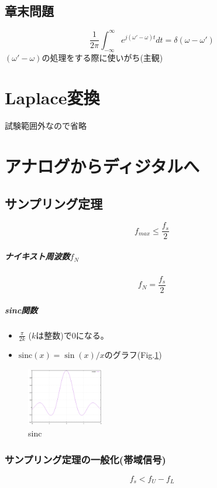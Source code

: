 \documentclass[twocolumn]{ltjsarticle}
\begin{document}
\subsection{章末問題}
$$\frac{1}{2\pi}\int_{-\infty}^{\infty}e^{j(\omega'-\omega)t}dt=\delta(\omega-\omega')$$
$(\omega'-\omega)$の処理をする際に使いがち(主観)
\section{Laplace変換}
試験範囲外なので省略
\section{アナログからディジタルへ}
\subsection{サンプリング定理}
$$f_{max}\leq\frac{f_s}{2}$$
\subparagraph{ナイキスト周波数$f_N$}
$$f_N=\frac{f_s}{2}$$
\subparagraph{sinc関数}
\begin{itemize}
    \item $\frac{\pi}{2k}$ ($k$は整数)で0になる。
    \item $\mathrm{sinc}(x)=\sin(x)/{x}$のグラフ(Fig.\ref{fig_sinc})
\end{itemize}
\begin{figure}[ht]
    \centering
    \includegraphics[width=0.3\textwidth]{./fig/fig_sinc.png}
    \caption{sinc}
    \label{fig_sinc}
\end{figure}
\subsubsection{サンプリング定理の一般化(帯域信号)}
$$f_s<f_U-f_L$$
\end{document}
